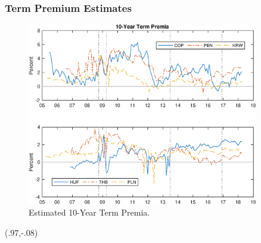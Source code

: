 \documentclass[12pt, xcolor=dvipsnames]{beamer} 			         %
\begin{document}
\begin{frame}[label=tp_10yrA]
	\frametitle{Term Premium Estimates}
	\begin{figure}[!htbp]
		\begin{center}
			\includegraphics[width=0.9\textwidth,height=0.65\textheight]{../Figures/rp_10yr_1}
			\par\end{center}
		\caption{Estimated 10-Year Term Premia.}\label{fig:tp_10yrA}
	\end{figure}
	\begin{textblock*}{3cm}(.97\textwidth,-.08\textheight)
		\hyperlink{tp_10yrB}{}
	\end{textblock*}
\end{frame}
\end{document}
